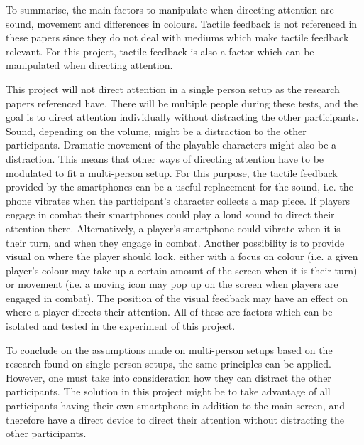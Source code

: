 To summarise, the main factors to manipulate when directing attention are sound, movement and differences in colours. Tactile feedback is not referenced in these papers since they do not deal with mediums which make tactile feedback relevant. For this project, tactile feedback is also a factor which can be manipulated when directing attention. 

This project will not direct attention in a single person setup as the research papers referenced have. There will be multiple people during these tests, and the goal is to direct attention individually without distracting the other participants. Sound, depending on the volume, might be a distraction to the other participants. Dramatic movement of the playable characters might also be a distraction. This means that other ways of directing attention have to be modulated to fit a multi-person setup. For this purpose, the tactile feedback provided by the smartphones can be a useful replacement for the sound, i.e. the phone vibrates when the participant's character collects a map piece. If players engage in combat their smartphones could play a loud sound to direct their attention there. Alternatively, a player's smartphone could vibrate when it is their turn, and when they engage in combat. Another possibility is to provide visual on where the player should look, either with a focus on colour (i.e. a given player's colour may take up a certain amount of the screen when it is their turn) or movement (i.e. a moving icon may pop up on the screen when players are engaged in combat). The position of the visual feedback may have an effect on where a player directs their attention. All of these are factors which can be isolated and tested in the experiment of this project.

To conclude on the assumptions made on multi-person setups based on the research found on single person setups, the same principles can be applied. However, one must take into consideration how they can distract the other participants. The solution in this project might be to take advantage of all participants having their own smartphone in addition to the main screen, and therefore have a direct device to direct their attention without distracting the other participants.